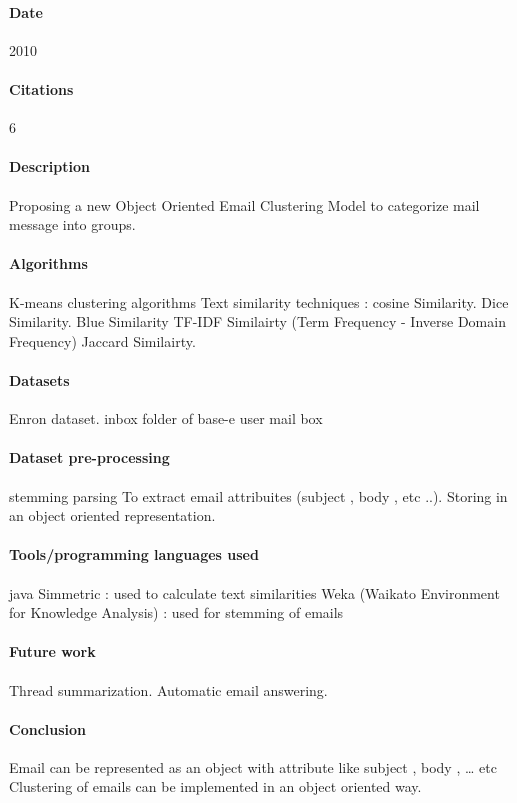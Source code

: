 \documentclass[12pt]{article}
\begin{document}
\paragraph{Date} 2010
\paragraph{Citations}6
\paragraph{Description}
Proposing a new Object Oriented Email Clustering Model to categorize mail message into groups.

\paragraph{Algorithms}
K-means clustering algorithms
Text similarity techniques :
cosine Similarity.
Dice Similarity.
Blue Similarity
TF-IDF Similairty (Term Frequency - Inverse Domain Frequency)
Jaccard Similairty.

\paragraph{Datasets}
Enron dataset.
inbox folder of base-e user mail box

\paragraph{Dataset pre-processing}
stemming
parsing
To extract email attribuites (subject , body , etc ..).
Storing in an object oriented representation.

\paragraph{Tools/programming languages used}
java
Simmetric : used to calculate text similarities
Weka (Waikato Environment for Knowledge Analysis) : used for stemming of emails

\paragraph{Future work}
Thread summarization.
Automatic email answering.

\paragraph{Conclusion}
Email can be represented as an object with attribute like subject , body , … etc
Clustering of emails can be implemented in an object oriented way.
\end{document}
